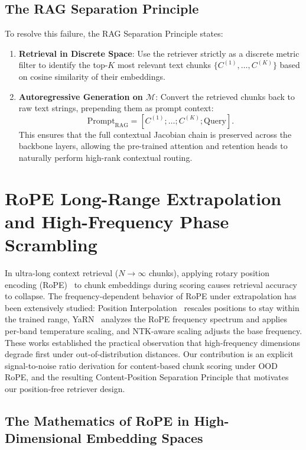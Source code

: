 \documentclass[preprint,12pt]{elsarticle}
\begin{document}
\subsection{The RAG Separation Principle}

To resolve this failure, the RAG Separation Principle states:
\begin{enumerate}
    \item \textbf{Retrieval in Discrete Space}: Use the retriever strictly as a discrete metric filter to identify the top-$K$ most relevant text chunks $\{C^{(1)}, \ldots, C^{(K)}\}$ based on cosine similarity of their embeddings.
    \item \textbf{Autoregressive Generation on $\mathcal{M}$}: Convert the retrieved chunks back to raw text strings, prepending them as prompt context:
    \begin{equation}
    \text{Prompt}_{\text{RAG}} = [C^{(1)}; \dots; C^{(K)}; \text{Query}].
    \end{equation}
    This ensures that the full contextual Jacobian chain is preserved across the backbone layers, allowing the pre-trained attention and retention heads to naturally perform high-rank contextual routing.
\end{enumerate}

\section{RoPE Long-Range Extrapolation and High-Frequency Phase Scrambling}
\label{app:proof42}

In ultra-long context retrieval ($N \to \infty$ chunks), applying rotary position encoding (RoPE)~\cite{rope} to chunk embeddings during scoring causes retrieval accuracy to collapse. The frequency-dependent behavior of RoPE under extrapolation has been extensively studied: Position Interpolation~\cite{pi} rescales positions to stay within the trained range, YaRN~\cite{yarn} analyzes the RoPE frequency spectrum and applies per-band temperature scaling, and NTK-aware scaling adjusts the base frequency. These works established the practical observation that high-frequency dimensions degrade first under out-of-distribution distances. Our contribution is an explicit signal-to-noise ratio derivation for content-based chunk scoring under OOD RoPE, and the resulting Content-Position Separation Principle that motivates our position-free retriever design.

\subsection{The Mathematics of RoPE in High-Dimensional Embedding Spaces}
\end{document}
